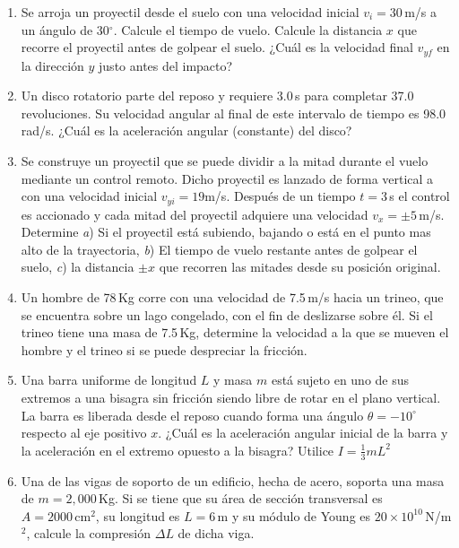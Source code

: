 \documentclass{article}
\begin{document}
\begin{enumerate}

\item Se arroja un proyectil desde el suelo con una velocidad inicial
$v_{i}=30$\,m/s a un \'angulo de 30$^{\circ}$. Calcule el tiempo de vuelo.
Calcule la distancia $x$ que recorre el proyectil antes de golpear el suelo.
¿Cuál es la velocidad final $v_{yf}$ en la dirección $y$ justo antes del
impacto?

\item Un disco rotatorio parte del reposo y requiere 3.0\,s para completar 37.0
revoluciones. Su velocidad angular al final de este intervalo de tiempo es
98.0\,rad/s. ¿Cuál es la aceleración angular (constante) del disco?

\item Se construye un proyectil que se puede dividir a la mitad durante el
vuelo mediante un control remoto. Dicho proyectil es lanzado de forma vertical
a con una velocidad inicial $v_{yi}=19$m/s. Después de un tiempo $t=3$\,s el
control es accionado y cada mitad del proyectil adquiere una velocidad $v_{x} =
\pm5$\,m/s. Determine \emph{a}) Si el proyectil está subiendo, bajando o está
en el punto mas alto de la trayectoria, \emph{b}) El tiempo de vuelo restante
antes de golpear el suelo, \emph{c}) la distancia $\pm x$ que recorren las
mitades desde su posición original.

\item Un hombre de 78\,Kg corre con una velocidad de 7.5\,m/s hacia un trineo, 
que se encuentra sobre un lago congelado, con el fin de deslizarse sobre él. Si
el trineo tiene una masa de 7.5\,Kg, determine la velocidad a la que se mueven
el hombre y el trineo si se puede despreciar la fricción.

\item Una barra uniforme de longitud $L$ y masa $m$ está sujeto en uno de sus
extremos a una bisagra sin fricción siendo libre de rotar en el plano vertical.
La barra es liberada desde el reposo cuando forma una ángulo $\theta =
-10^{\circ}$  respecto al eje positivo $x$. ¿Cuál es la aceleración angular
inicial de la barra y la aceleración en el extremo opuesto a la bisagra?
Utilice $I= \frac{1}{3}mL^{2}$

\item Una de las vigas de soporto de un edificio, hecha de acero, soporta una
masa de $m=2,000$\,Kg. Si se tiene que su área de sección transversal es
$A=2000\,\text{cm}^{2}$, su longitud es $L=6$\,m y su módulo de Young es $20
\times 10^{10}$\,N/m$^{2}$, calcule la compresión $\Delta L$ de dicha viga.

\end{enumerate}
\end{document}
